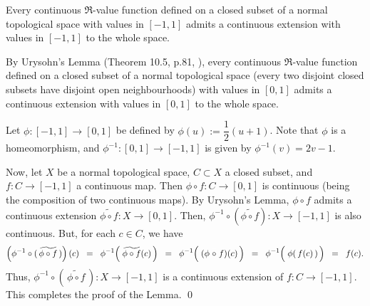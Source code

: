
\vskip 0.5cm
\begin{lemma}
\label{NormalContinuousExtensionLemma}
\mbox{}\vskip 0.1cm
\noindent
Every continuous $\Re$-value function defined on a closed subset
of a normal topological space with values in $[-1,1]$
admits a continuous extension with values in $[-1,1]$ to the whole space.
\end{lemma}
\proof
By Urysohn's Lemma (Theorem 10.5, p.81, \cite{Aliprantis1998}),
every continuous $\Re$-value function defined on a closed subset of a normal topological space
(every two disjoint closed subsets have disjoint open neighbourhoods)
with values in $[0,1]$ admits a continuous extension with values in $[0,1]$
to the whole space.

\vskip 0.3cm
\noindent
Let $\phi : [-1,1] \longrightarrow [0,1]$ be defined by $\phi(u) := \dfrac{1}{2}(u + 1)$.
Note that $\phi$ is a homeomorphism, and $\phi^{-1} : [0,1] \longrightarrow [-1,1]$
is given by $\phi^{-1}(v) = 2v-1$.

\vskip 0.3cm
\noindent
Now, let $X$ be a normal topological space, $C \subset X$ a closed subset, and
$f : C \longrightarrow [-1,1]$ a continuous map.
Then $\phi \circ f : C \longrightarrow [0,1]$ is continuous (being the composition of two continuous maps).
By Urysohn's Lemma, $\phi \circ f$ admits a continuous extension
$\widetilde{\phi \circ f} : X \longrightarrow [0,1]$.
Then, $\phi^{-1} \circ (\widetilde{\phi \circ f}) : X \longrightarrow [-1,1]$ is also continuous.
But, for each $c \in C$, we have
\begin{equation*}
\left(\phi^{-1} \circ (\,\widetilde{\phi \circ f}\,)\right)(c)
\;\; = \;\;
	\phi^{-1}\!\left(\; \widetilde{\phi \circ f}(c) \,\right)
\;\; = \;\;
	\phi^{-1}\!\left(\; (\phi \overset{{\color{white}-}}{\circ} f)(c) \,\right)
\;\; = \;\;
	\phi^{-1}\!\left(\; \overset{{\color{white}.}}{\phi}(\,f(c)\,) \,\right)
\;\; = \;\;
	f(c).
\end{equation*}
Thus, $\phi^{-1} \circ (\,\widetilde{\phi \circ f}\,) : X \longrightarrow [-1,1]$
is a continuous extension of $f : C \longrightarrow [-1,1]$.
This completes the proof of the Lemma.
\qed


\renewcommand{\theenumi}{\roman{enumi}}
\renewcommand{\labelenumi}{\textnormal{(\theenumi)}$\;\;$}

